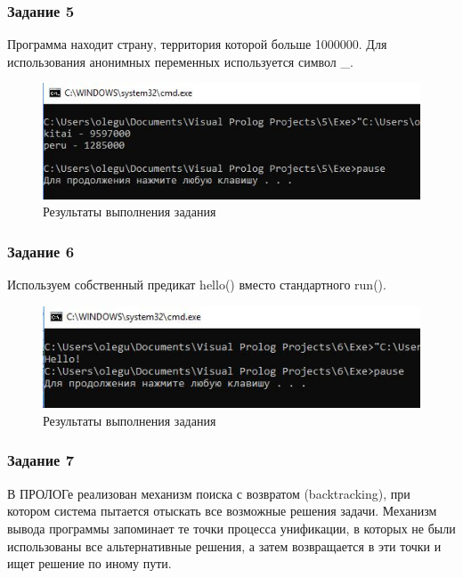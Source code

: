 \documentclass[14pt,a4paper,report]{report}
\begin{document}
\subsubsection{Задание 5}

Программа находит страну, территория которой больше 1000000. Для использования анонимных переменных используется символ \_.



\begin{figure}[h!]
	\centering
	\includegraphics[scale = 0.9]{images/d5.png}
	\caption{Результаты выполнения задания}
\end{figure}
\clearpage
\subsubsection{Задание 6}

Используем собственный предикат hello() вместо стандартного run().





\begin{figure}[h!]
	\centering
	\includegraphics[scale = 0.9]{images/d6.png}
	\caption{Результаты выполнения задания}
\end{figure}
\clearpage
\subsubsection{Задание 7}

В ПРОЛОГе реализован механизм поиска с возвратом (backtracking), при котором система пытается отыскать все возможные решения задачи. Механизм вывода программы запоминает те точки процесса унификации, в которых не были использованы все альтернативные решения, а затем возвращается в эти точки и ищет решение по иному пути.
\end{document}
